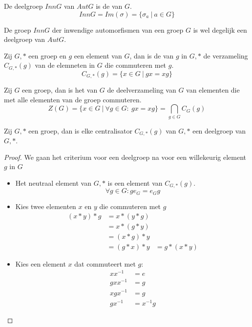 \documentclass[main.tex]{subfiles}
\begin{document}
\begin{de}
  De deelgroep $InnG$ van $AutG$ is de  van $G$.
  \[ InnG = Im(\sigma) = \{ \sigma_{a}\ |\ a \in G \} \]
\end{de}

\begin{st}
  De groep $InnG$ der inwendige automorfismen van een groep $G$ is wel degelijk een deelgroep van $AutG$.
\end{st}


\begin{de}
  Zij $G,*$ een groep en $g$ een element van $G$, dan is de  van $g$ in $G,*$ de verzameling $C_{G,*}(g)$ van de elemneten in $G$ die commuteren met $g$.
  \[ C_{G,*}(g) = \{ x \in G\ |\ gx = xg \} \]
\end{de}

\begin{de}
  Zij $G$ een groep, dan is het  van $G$ de deelverzameling van $G$ van elementen die met alle elementen van de groep commuteren.
  \[ Z(G) = \{ x \in G\ |\ \forall g \in G:\ gx = xg\} = \bigcap_{g \in G}C_{G}(g) \]
\end{de}

\begin{ei}
  Zij $G,*$ een groep, dan is elke centralisator $C_{G,*}(g)$ van $G,*$ een deelgroep van $G,*$.
  \begin{proof}
    We gaan het criterium voor een deelgroep na voor een willekeurig element $g$ in $G$
    \begin{itemize}
    \item Het neutraal element van $G,*$ is een element van $C_{G,*}(g)$.
      \[ \forall g\in G: ge_{G} = e_{G}g \]
    \item Kies twee elementen $x$ en $y$ die commuteren met $g$
      \[
      \begin{array}{rll}
        (x*y)*g &= x*(y*g)&\\
                &= x*(g*y) &\\
                &= (x*g)*y &\\
                &= (g*x)*y &= g*(x*y)
      \end{array}
      \]
    \item Kies een element $x$ dat commuteert met $g$:
      \[
      \begin{array}{rl}
        xx^{-1} &= e\\
        gxx^{-1} &= g\\
        xgx^{-1} &= g\\
        gx^{-1} &= x^{-1}g
      \end{array}
      \]
    \end{itemize}
  \end{proof}
\end{ei}
\end{document}

